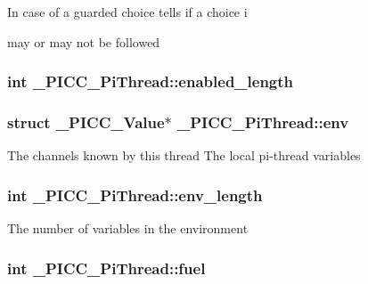 \begin{DoxyVerb}In case of a guarded choice tells if a choice i 
\end{DoxyVerb}
 may or may not be followed \hypertarget{struct__PICC__PiThread_a0443e5525ef66064fbfb5ea4722f0fda}{
\subsubsection[{enabled\-\_\-length}]{\setlength{\rightskip}{0pt plus 5cm}int \-\_\-\-P\-I\-C\-C\-\_\-\-Pi\-Thread\-::enabled\-\_\-length}}\label{struct__PICC__PiThread_a0443e5525ef66064fbfb5ea4722f0fda}
\hypertarget{struct__PICC__PiThread_a5d92f4b0053eaaca39a89c602c3b3d8b}{
\subsubsection[{env}]{\setlength{\rightskip}{0pt plus 5cm}struct {\bf \-\_\-\-P\-I\-C\-C\-\_\-\-Value}$\ast$ \-\_\-\-P\-I\-C\-C\-\_\-\-Pi\-Thread\-::env}}\label{struct__PICC__PiThread_a5d92f4b0053eaaca39a89c602c3b3d8b}
The channels known by this thread The local pi-\/thread variables \hypertarget{struct__PICC__PiThread_a8fce59a9f1cf87c981af443cba62fb86}{
\subsubsection[{env\-\_\-length}]{\setlength{\rightskip}{0pt plus 5cm}int \-\_\-\-P\-I\-C\-C\-\_\-\-Pi\-Thread\-::env\-\_\-length}}\label{struct__PICC__PiThread_a8fce59a9f1cf87c981af443cba62fb86}
The number of variables in the environment \hypertarget{struct__PICC__PiThread_ade9af8e74e38619a991f6881a0ff2e1e}{
\subsubsection[{fuel}]{\setlength{\rightskip}{0pt plus 5cm}int \-\_\-\-P\-I\-C\-C\-\_\-\-Pi\-Thread\-::fuel}}\label{struct__PICC__PiThread_ade9af8e74e38619a991f6881a0ff2e1e}
